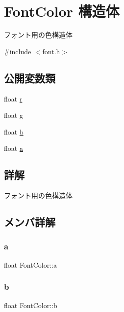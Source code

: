 \hypertarget{struct_font_color}{}\section{Font\+Color 構造体}
\label{struct_font_color}


フォント用の色構造体  




{\ttfamily \#include $<$font.\+h$>$}

\subsection*{公開変数類}
\begin{DoxyCompactItemize}
\item 
float \mbox{\hyperlink{struct_font_color_a194c6908e2594b30387e7e127e340f87}{r}}
\item 
float \mbox{\hyperlink{struct_font_color_aee91e6024a40a2bc4a21cc427c9102a6}{g}}
\item 
float \mbox{\hyperlink{struct_font_color_af282546f7dc30a812f5f174f7bf33098}{b}}
\item 
float \mbox{\hyperlink{struct_font_color_aa093d6bd66be078e43a00e1c9048403b}{a}}
\end{DoxyCompactItemize}


\subsection{詳解}
フォント用の色構造体 

\subsection{メンバ詳解}
\mbox{\label{struct_font_color_aa093d6bd66be078e43a00e1c9048403b}} 
\subsubsection{\texorpdfstring{a}{a}}
{\footnotesize\ttfamily float Font\+Color\+::a}

\mbox{\label{struct_font_color_af282546f7dc30a812f5f174f7bf33098}} 
\subsubsection{\texorpdfstring{b}{b}}
{\footnotesize\ttfamily float Font\+Color\+::b}

